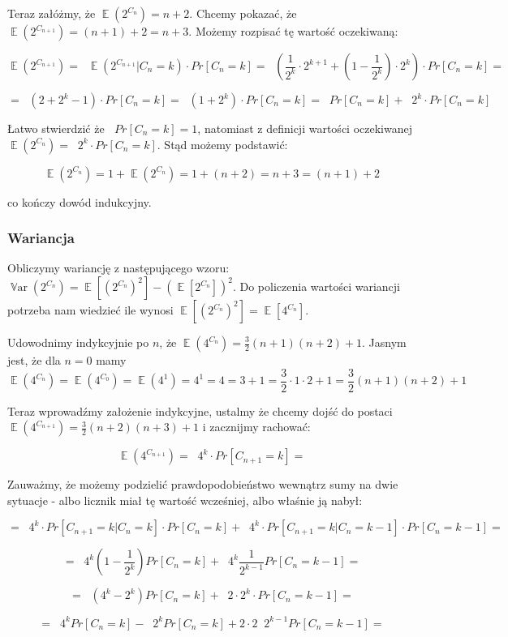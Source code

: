 \documentclass{article}
\DeclareMathOperator{\EX}{\mathbb{E}}%
\DeclareMathOperator{\Var}{\mathbb{V}ar}%
\DeclareMathOperator{\sumk}{\sum_{k \ge 0}}
\begin{document}
    Teraz załóżmy, że $\EX(2^{C_n}) = n + 2$. Chcemy pokazać, że $\EX(2^{C_{n+1}}) = (n + 1) + 2 = n + 3$.
    Możemy rozpisać tę wartość oczekiwaną:

    \[ \EX(2^{C_{n+1}}) = \sumk \EX(2^{C_{n+1}} | C_n = k) \cdot Pr[C_n = k] = \sumk (\frac{1}{2^k} \cdot 2^{k+1} + (1 - \frac{1}{2^k}) \cdot 2^k) \cdot Pr[C_n = k] = \]

    \[ = \sumk (2 + 2^k - 1) \cdot Pr[C_n = k] = \sumk (1 + 2^k) \cdot Pr[C_n = k] = \sumk Pr[C_n = k] + \sumk 2^k \cdot Pr[C_n = k] \]
    
    Łatwo stwierdzić że $\sumk Pr[C_n = k] = 1$, natomiast z definicji wartości oczekiwanej $\EX(2^{C_n}) = \sumk 2^k \cdot Pr[C_n = k]$. Stąd możemy podstawić:

    \[ \EX(2^{C_n}) = 1 + \EX(2^{C_n}) = 1 + (n + 2) = n + 3 = (n + 1) + 2 \]

    co kończy dowód indukcyjny.
    \subsubsection{Wariancja}
    Obliczymy wariancję z następującego wzoru: $\Var(2^{C_n}) = \EX[(2^{C_n})^2] - (\EX[2^{C_n}])^2$. Do policzenia wartości wariancji potrzeba nam wiedzieć ile wynosi $\EX[(2^{C_n})^2] = \EX[4^{C_n}]$.

    Udowodnimy indykcyjnie po $n$, że $\EX(4^{C_n}) = \frac{3}{2}(n+1)(n+2) + 1$. Jasnym jest, że dla $n = 0$ mamy 
    \[ \EX(4^{C_n}) = \EX(4^{C_0}) = \EX(4^1) = 4^1 = 4 = 3 + 1 = \frac{3}{2} \cdot 1 \cdot 2 + 1 = \frac{3}{2}(n+1)(n+2) + 1 \]

    Teraz wprowadźmy założenie indykcyjne, ustalmy że chcemy dojść do postaci $\EX(4^{C_{n+1}}) = \frac{3}{2}(n+2)(n+3) + 1$ i zacznijmy rachować:

    \[ \EX(4^{C_{n+1}}) = \sumk 4^k \cdot Pr[C_{n+1}=k] = \]

    Zauważmy, że możemy podzielić prawdopodobieństwo wewnątrz sumy na dwie sytuacje - albo licznik miał tę wartość wcześniej, albo właśnie ją nabył:
    
    \[ = \sumk 4^k \cdot Pr[C_{n+1}=k | C_n=k] \cdot Pr[C_n=k] + \sumk 4^k \cdot Pr[C_{n+1}=k | C_n=k-1] \cdot Pr[C_n=k-1] = \]

    \[ = \sumk 4^k (1 - \frac{1}{2^k}) Pr[C_n=k] + \sumk 4^k \frac{1}{2^{k-1}} Pr[C_n=k-1] = \]
    
    \[ = \sumk (4^k - 2^k) Pr[C_n=k] + \sumk 2 \cdot 2^k \cdot Pr[C_n=k-1] = \]

    \[ = \sumk 4^k Pr[C_n=k] - \sumk 2^k Pr[C_n=k] + 2 \cdot 2 \sumk 2^{k-1} Pr[C_n=k-1] = \]
\end{document}
